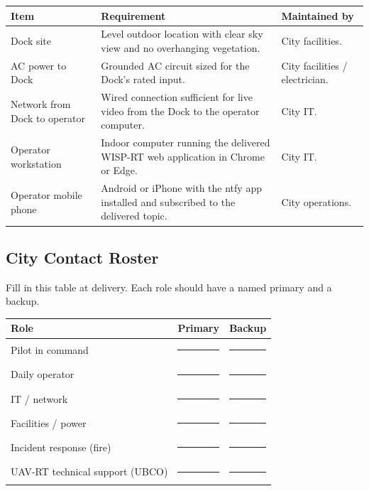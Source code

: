 \documentclass[11pt,letterpaper]{article}
\begin{document}
\begin{longtable}{@{}p{3.4cm}p{7cm}p{4cm}@{}}
\toprule
\textbf{Item} & \textbf{Requirement} & \textbf{Maintained by} \\
\midrule
Dock site & Level outdoor location with clear sky view and no overhanging vegetation. & City facilities. \\
\addlinespace
AC power to Dock & Grounded AC circuit sized for the Dock's rated input. & City facilities / electrician. \\
\addlinespace
Network from Dock to operator & Wired connection sufficient for live video from the Dock to the operator computer. & City IT. \\
\addlinespace
Operator workstation & Indoor computer running the delivered WISP-RT web application in Chrome or Edge. & City IT. \\
\addlinespace
Operator mobile phone & Android or iPhone with the ntfy app installed and subscribed to the delivered topic. & City operations. \\
\bottomrule
\end{longtable}

\subsection{City Contact Roster}
\label{sec:contact-roster}

Fill in this table at delivery. Each role should have a named primary
and a backup.

\begin{longtable}{@{}p{4.5cm}p{5cm}p{5cm}@{}}
\toprule
\textbf{Role} & \textbf{Primary} & \textbf{Backup} \\
\midrule
Pilot in command               & \rule{4.5cm}{0.4pt} & \rule{4.5cm}{0.4pt} \\
Daily operator                 & \rule{4.5cm}{0.4pt} & \rule{4.5cm}{0.4pt} \\
IT / network                   & \rule{4.5cm}{0.4pt} & \rule{4.5cm}{0.4pt} \\
Facilities / power             & \rule{4.5cm}{0.4pt} & \rule{4.5cm}{0.4pt} \\
Incident response (fire)       & \rule{4.5cm}{0.4pt} & \rule{4.5cm}{0.4pt} \\
UAV-RT technical support (UBCO) & \rule{4.5cm}{0.4pt} & \rule{4.5cm}{0.4pt} \\
\bottomrule
\end{longtable}

\end{document}
